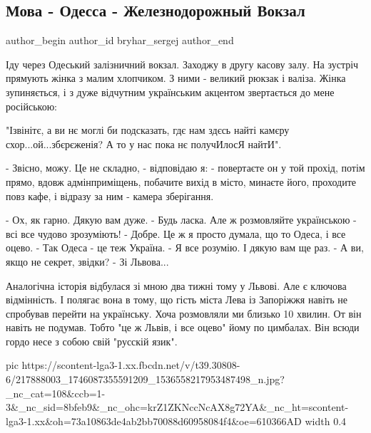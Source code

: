  
 
 
 
 
 
\subsection{Мова - Одесса - Железнодорожный Вокзал}
\label{sec:21_07_2021.fb.bryhar_sergej.1.mova_odessa_vokzal}
 
\ifcmt
 author_begin
   author_id bryhar_sergej
 author_end
\fi

Іду через Одеський залізничний вокзал. Заходжу в другу касову залу. На зустріч
прямують жінка з малим хлопчиком. З ними - великий рюкзак і валіза. Жінка
зупиняється, і з дуже відчутним українським акцентом звертається до мене
російською: 

"Ізвінітє, а ви нє моглі би подсказать, гдє нам здєсь найті камєру
схор...ой...збєрєженія? А то у нас пока нє получИлосЯ найтИ".

- Звісно, можу. Це не складно, - відповідаю я: - повертаєте он у той прохід,
потім прямо, вдовж адмінприміщень, побачите вихід в місто, минаєте його,
проходите повз кафе, і відразу за ним - камера зберігання.

\obeycr
- Ох, як гарно. Дякую вам дуже. 
- Будь ласка. Але ж розмовляйте українською - всі все чудово зрозуміють!
- Добре. Це ж я просто думала, що то Одеса, і все оцево.
- Так Одеса - це теж Україна.
- Я все розумію. І дякую вам ще раз.
- А ви, якщо не секрет, звідки?
- Зі Львова...
\restorecr

Аналогічна історія відбулася зі мною два тижні тому у Львові. Але є ключова
відмінність. І полягає вона в тому, що гість міста Лева із Запоріжжя навіть не
спробував перейти на українську. Хоча розмовляли ми близько 10 хвилин. От він
навіть не подумав. Тобто "це ж Львів, і все оцево" йому по цимбалах. Він всюди
гордо несе з собою свій "русскій язик".

\ifcmt
  pic https://scontent-lga3-1.xx.fbcdn.net/v/t39.30808-6/217888003_1746087355591209_1536558217953487498_n.jpg?_nc_cat=108&ccb=1-3&_nc_sid=8bfeb9&_nc_ohc=krZ1ZKNccNcAX8g72YA&_nc_ht=scontent-lga3-1.xx&oh=73a10863de4ab2bb70088d60958084f4&oe=610366AD
  width 0.4
\fi

